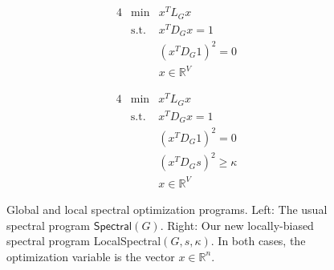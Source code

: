 \documentclass[11pt]{article}
\begin{document}
\begin{figure}
\begin{minipage}{0.5\textwidth}
\begin{alignat*}{4}
  &\text{min} & x^T  L_{G} x \\
                     &\text{s.t.} & x^T D_{G} x = 1  \\
                     &            & (x^T D_{G} 1)^2 = 0  \\
		  &            & x \in \mathbb{R}^V
\end{alignat*}
\end{minipage}
\begin{minipage}{0.5\textwidth}
\begin{alignat*}{4}
 &\text{min} & x^T  L_{G} x               \\
                     &\text{s.t.} & x^T  D_{G} x = 1           \\
		   &            & (x^T D_{G} 1)^2 = 0  \\
                     &            &(x^T D_{G} s) ^2 \geq \kappa   \\
		  &            & x \in \mathbb{R}^V
\end{alignat*}
\end{minipage}
\caption{Global and local spectral optimization programs.
Left: The usual spectral program $\mathsf{Spectral}(G)$. 
Right: Our new locally-biased spectral program 
\textsf{LocalSpectral}$(G,s,\kappa)$.  
In both cases, the optimization variable is the vector $x \in \mathbb{R}^{n}$.
}
\label{fig:spectral}
\end{figure}
\end{document}
